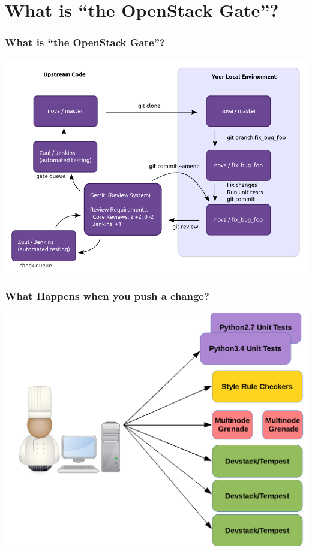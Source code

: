 \documentclass[aspectratio=169,11pt,hyperref={colorlinks=true}]{beamer}
\begin{document}
\section{What is ``the OpenStack Gate''?}
\begin{frame}
    \frametitle{What is ``the OpenStack Gate''?}
	\begin{center}
		\includegraphics[width=.65\textwidth]{code_review.png}
	\end{center}
\end{frame}

\begin{frame}
\frametitle{What Happens when you push a change?}
\begin{center}
	\includegraphics[width=.7\textwidth]{jobs.png}
\end{center}
\end{frame}
\end{document}
